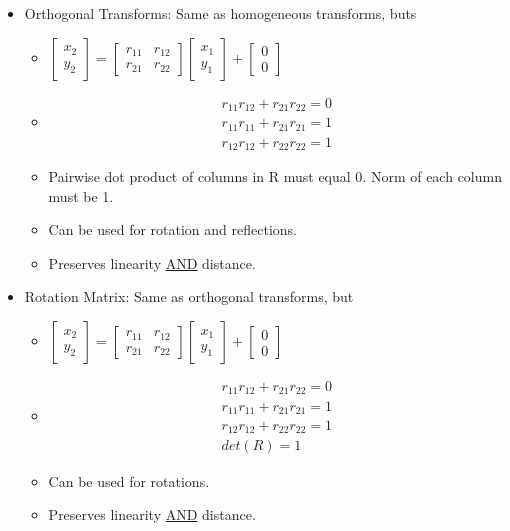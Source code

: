 \documentclass[../main.tex]{subfiles}
\begin{document}
\begin{itemize}
    \item Orthogonal Transforms: Same as homogeneous transforms, buts
    \begin{itemize}
      \item $\begin{bmatrix} x_{2} \\ y_{2} \end{bmatrix} = \begin{bmatrix} r_{11} & r_{12} \\ r_{21} & r_{22} \end{bmatrix} \begin{bmatrix} x_{1} \\ y_{1} \end{bmatrix} + \begin{bmatrix} 0 \\ 0 \end{bmatrix}$
      \item \begin{align*} r_{11}r_{12} + r_{21}r_{22} = 0 \\ r_{11}r_{11} + r_{21}r_{21} = 1 \\ r_{12}r_{12} + r_{22}r_{22} = 1 \end{align*}
      \item Pairwise dot product of columns in R must equal 0. Norm of each column must be 1.
      \item Can be used for rotation and reflections.
      \item Preserves linearity \underline{AND} distance.
    \end{itemize}

    \item Rotation Matrix: Same as orthogonal transforms, but
    \begin{itemize}
      \item $\begin{bmatrix} x_{2} \\ y_{2} \end{bmatrix} = \begin{bmatrix} r_{11} & r_{12} \\ r_{21} & r_{22} \end{bmatrix} \begin{bmatrix} x_{1} \\ y_{1} \end{bmatrix} + \begin{bmatrix} 0 \\ 0 \end{bmatrix}$
      \item \begin{align*} r_{11}r_{12} + r_{21}r_{22} = 0 \\ r_{11}r_{11} + r_{21}r_{21} = 1 \\ r_{12}r_{12} + r_{22}r_{22} = 1 \\ det(R) = 1\end{align*}
      \item Can be used for rotations.
      \item Preserves linearity \underline{AND} distance.
    \end{itemize}


\end{itemize}
\end{document}
